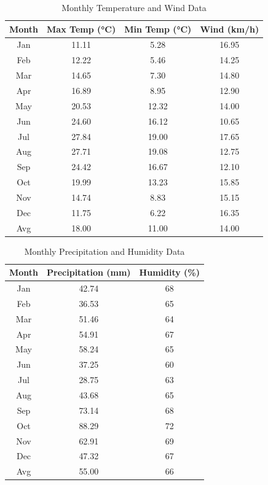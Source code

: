 \documentclass[conference]{IEEEtran}
\begin{document}
\begin{table}[htbp]
\caption{Monthly Temperature and Wind Data}
\begin{center}
\begin{tabular}{|c|c|c|c|}
\hline
\textbf{Month} & \textbf{Max Temp (°C)} & \textbf{Min Temp (°C)} & \textbf{Wind (km/h)} \\
\hline
Jan & 11.11 & 5.28 & 16.95 \\
\hline
Feb & 12.22 & 5.46 & 14.25 \\
\hline
Mar & 14.65 & 7.30 & 14.80 \\
\hline
Apr & 16.89 & 8.95 & 12.90 \\
\hline
May & 20.53 & 12.32 & 14.00 \\
\hline
Jun & 24.60 & 16.12 & 10.65 \\
\hline
Jul & 27.84 & 19.00 & 17.65 \\
\hline
Aug & 27.71 & 19.08 & 12.75 \\
\hline
Sep & 24.42 & 16.67 & 12.10 \\
\hline
Oct & 19.99 & 13.23 & 15.85 \\
\hline
Nov & 14.74 & 8.83 & 15.15 \\
\hline
Dec & 11.75 & 6.22 & 16.35 \\
\hline
Avg & 18.00 & 11.00 & 14.00 \\
\hline
\end{tabular}
\label{tab:monthly_temp_wind}
\end{center}
\end{table}

\begin{table}[htbp]
\caption{Monthly Precipitation and Humidity Data}
\begin{center}
\begin{tabular}{|c|c|c|}
\hline
\textbf{Month} & \textbf{Precipitation (mm)} & \textbf{Humidity (\%)} \\
\hline
Jan & 42.74 & 68 \\
\hline
Feb & 36.53 & 65 \\
\hline
Mar & 51.46 & 64 \\
\hline
Apr & 54.91 & 67 \\
\hline
May & 58.24 & 65 \\
\hline
Jun & 37.25 & 60 \\
\hline
Jul & 28.75 & 63 \\
\hline
Aug & 43.68 & 65 \\
\hline
Sep & 73.14 & 68 \\
\hline
Oct & 88.29 & 72 \\
\hline
Nov & 62.91 & 69 \\
\hline
Dec & 47.32 & 67 \\
\hline
Avg & 55.00 & 66 \\
\hline
\end{tabular}
\label{tab:monthly_precip_humidity}
\end{center}
\end{table}
\end{document}
